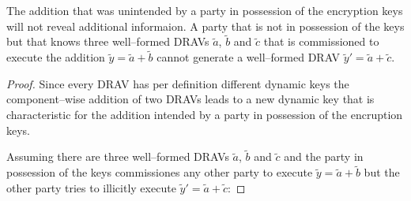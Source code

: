 \begin{lem}
  \label{lem:wrong-add}

  The addition that was unintended by a party in possession of the encryption
  keys will not reveal additional informaion. A party that is not in possession
  of the keys but that knows three well--formed DRAVs $\widetilde{a}$,
  $\widetilde{b}$ and $\widetilde{c}$ that is commissioned to execute the
  addition $\widetilde{y} = \widetilde{a} + \widetilde{b}$ cannot generate a
  well--formed DRAV $\widetilde{y}' = \widetilde{a} + \widetilde{c}$.

\end{lem}

\begin{proof}

  Since every DRAV has per definition different dynamic keys the
  component--wise addition of two DRAVs leads to a new dynamic key that is
  characteristic for the addition intended by a party in possession of the
  encruption keys.

  Assuming there are three well--formed DRAVs $\widetilde{a}$, $\widetilde{b}$
  and $\widetilde{c}$ and the party in possession of the keys commissiones any
  other party to execute $\widetilde{y} = \widetilde{a} + \widetilde{b}$ but the
  other party tries to illicitly execute $\widetilde{y}' = \widetilde{a} +
  \widetilde{c}$:


\end{proof}
